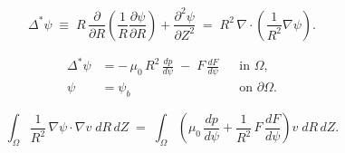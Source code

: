 

\begin{equation*}
  \Delta^{*}\psi \;\equiv\;
  R\,\frac{\partial}{\partial R}\!\left(\frac{1}{R}\frac{\partial \psi}{\partial R}\right)
  + \frac{\partial^{2}\psi}{\partial Z^{2}}
  \;=\; R^{2}\,\nabla\!\cdot\!\left(\frac{1}{R^{2}}\nabla\psi\right).
\end{equation*}

\begin{align*}
  \Delta^{*}\psi
    &= -\,\mu_{0}\,R^{2}\,\frac{dp}{d\psi}
       \;-\; F\,\frac{dF}{d\psi}
       && \text{in } \Omega, \\
  \psi &= \psi_{b}
       && \text{on } \partial\Omega .
\end{align*}

\begin{equation*}
  \int_{\Omega} \frac{1}{R^{2}}\,\nabla\psi\cdot\nabla v \; dR\,dZ
  \;=\;
  \int_{\Omega} \left(\mu_{0}\,\frac{dp}{d\psi}
      + \frac{1}{R^{2}}\,F\,\frac{dF}{d\psi}\right) v \; dR\,dZ .
\end{equation*}
